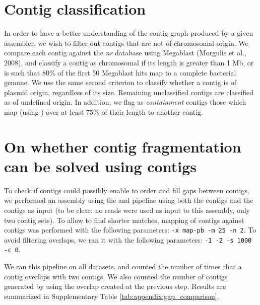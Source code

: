 \documentclass[../../main.tex]{subfiles}
\begin{document}
\section{Contig classification ~\label{sec:appendix_contig_classification}}

In order to have a better understanding of the contig graph produced by a given assembler, we wish to filter out contigs that are not of chromosomal origin. %
We compare each contig against the \emph{nr} database using Megablast (Morgulis et al., 2008), and classify a contig as chromosomal if its length is greater than 1 Mb, or is such that 80\% of the first 50 Megablast hits map to a complete bacterial genome. %
We use the same second criterion to classify whether a contig is of plasmid origin, regardless of its size. %
Remaining unclassified contigs are classified as of undefined origin. %
In addition, we flag as \emph{containment} contigs those which map (using \minimap) over at least 75\% of their length to another contig.%




\section{On whether \canu contig fragmentation can be solved using \miniasm contigs \label{sec:appendix:gap_comparison}}


To check if \miniasm contigs could possibly enable to order and fill gaps between \canu contigs, we performed an assembly using the \minimap and \miniasm pipeline using both the \canu contigs and the \miniasm contigs as input (to be clear: no reads were used as input to this assembly, only two contig sets). To allow \minimap to find shorter matches, mapping of \miniasm contigs against \canu contigs was performed with the following parameters: \texttt{-x map-pb -m 25 -n 2}. To avoid \miniasm filtering overlaps,  we ran it with the following parameters: \texttt{-1 -2 -s 1000 -c 0}.

We ran this pipeline on all datasets, and counted the number of times that a \miniasm contig overlaps with two \canu contigs. We also counted the number of contigs generated by \miniasm using the overlap created at the previous step. Results are summarized in Supplementary Table \ref{tab:appendix:gap_comparison}.
\end{document}
